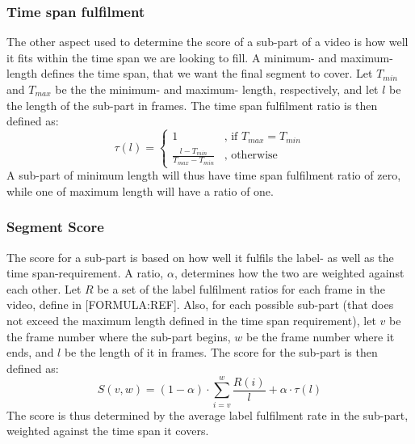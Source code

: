 \subsubsection{Time span fulfilment}
%
The other aspect used to determine the score of a sub-part of a video is how well it fits within the time span we are looking to fill. A minimum- and maximum- length defines the time span, that we want the final segment to cover. Let $T_{min}$ and $T_{max}$ be the the minimum- and maximum- length, respectively, and let $l$ be the length of the sub-part in frames. The time span fulfilment ratio is then defined as:\\
%
\begin{equation}
\tau(l) =
\begin{cases}
1 & \text{, if } T_{max} = T_{min}\\
\frac{l-T_{min}}{T_{max}-T_{min}} &  \text{, otherwise}
\end{cases}
\end{equation} 
%
A sub-part of minimum length will thus have time span fulfilment ratio of zero, while one of maximum length will have a ratio of one. 
%
\subsubsection{Segment Score}
%
The score for a sub-part is based on how well it fulfils the label- as well as the time span-requirement. A ratio, $\alpha$, determines how the two are weighted against each other. Let $R$ be a set of the label fulfilment ratios for each frame in the video, define in [FORMULA:REF]. Also, for each possible sub-part (that does not exceed the maximum length defined in the time span requirement), let $v$ be the frame number where the sub-part begins, $w$ be the frame number where it ends, and $l$ be the length of it in frames. The score for the sub-part is then defined as:\\
%
\begin{equation}
S(v,w) =(1-\alpha) \cdot \sum_{i=v}^{w} \frac{R(i)}{l} + \alpha \cdot \tau(l)
\end{equation}\label{equ:segment_score}
%
%
%
The score is thus determined by the average label fulfilment rate in the sub-part, weighted against the time span it covers.
%
%

